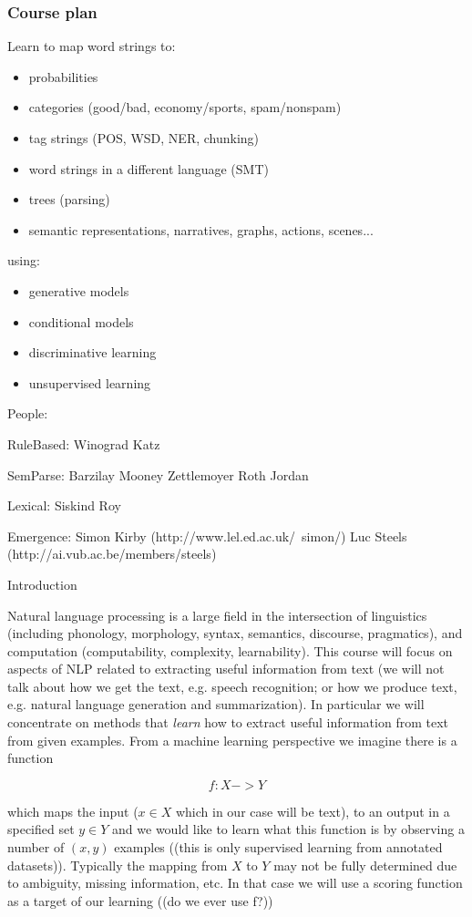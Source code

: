 \documentclass[ignorenonframetext]{beamer}
\begin{document}
\begin{frame}\frametitle{Course plan}
Learn to map word strings to:
\begin{itemize}
\item probabilities
\item categories (good/bad, economy/sports, spam/nonspam)
\item tag strings (POS, WSD, NER, chunking)
\item word strings in a different language (SMT)
\item trees (parsing)
\item semantic representations, narratives, graphs, actions, scenes...
\end{itemize}
using:
\begin{itemize}
\item generative models
\item conditional models
\item discriminative learning
\item unsupervised learning
\end{itemize}
\end{frame}

People:

RuleBased:
Winograd
Katz

SemParse:
Barzilay
Mooney
Zettlemoyer
Roth
Jordan

Lexical:
Siskind
Roy

Emergence:
Simon Kirby (http://www.lel.ed.ac.uk/~simon/)
Luc Steels (http://ai.vub.ac.be/members/steels)

Introduction

Natural language processing is a large field in the intersection of
linguistics (including phonology, morphology, syntax, semantics,
discourse, pragmatics), and computation (computability, complexity,
learnability).  This course will focus on aspects of NLP related to
extracting useful information from text (we will not talk about how we
get the text, e.g. speech recognition; or how we produce text,
e.g. natural language generation and summarization).  In particular we
will concentrate on methods that {\em learn} how to extract useful
information from text from given examples.  From a machine learning
perspective we imagine there is a function 

\[ f: X -> Y \]

which maps the input ($x \in X$ which in our case will be text), to an
output in a specified set $y \in Y$ and we would like to learn what
this function is by observing a number of $(x, y)$ examples ((this is
only supervised learning from annotated datasets)).  Typically the
mapping from $X$ to $Y$ may not be fully determined due to ambiguity,
missing information, etc.  In that case we will use a scoring function
as a target of our learning ((do we ever use f?))
\end{document}
